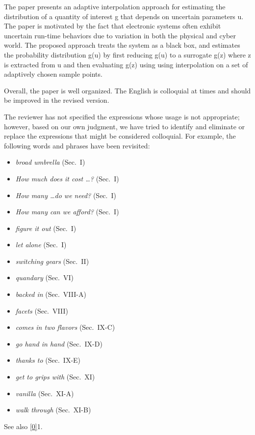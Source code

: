 \begin{reviewer}
The paper presents an adaptive interpolation approach for estimating the
distribution of a quantity of interest g that depends on uncertain parameters u.
The paper is motivated by the fact that electronic systems often  exhibit
uncertain run-time behaviors due to variation in both the physical and cyber
world. The proposed approach treats the system as a black box, and estimates the
probability distribution g(u) by first reducing g(u) to a surrogate g(z) where z
is extracted from u and then evaluating g(z) using using interpolation on a set
of adaptively chosen sample points.

Overall, the paper is well organized. The English is colloquial at times and
should be improved in the revised version.
\end{reviewer}

\begin{authors}
The reviewer has not specified the expressions whose usage is not appropriate;
however, based on our own judgment, we have tried to identify and eliminate or
replace the expressions that might be considered colloquial. For example, the
following words and phrases have been revisited:

\begin{itemize}
  \item \emph{broad umbrella} (Sec.~I)
  \item \emph{How much does it cost \dots?} (Sec.~I)
  \item \emph{How many \dots do we need?} (Sec.~I)
  \item \emph{How many can we afford?} (Sec.~I)
  \item \emph{figure it out} (Sec.~I)
  \item \emph{let alone} (Sec.~I)
  \item \emph{switching gears} (Sec.~II)
  \item \emph{quandary} (Sec.~VI)
  \item \emph{backed in} (Sec.~VIII-A)
  \item \emph{facets} (Sec.~VIII)
  \item \emph{comes in two flavors} (Sec.~IX-C)
  \item \emph{go hand in hand} (Sec.~IX-D)
  \item \emph{thanks to} (Sec.~IX-E)
  \item \emph{get to grips with} (Sec.~XI)
  \item \emph{vanilla} (Sec.~XI-A)
  \item \emph{walk through} (Sec.~XI-B)
\end{itemize}

See also \cref{0}{1}.

\begin{actions}
\end{actions}
\end{authors}

